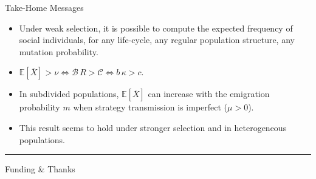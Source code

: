 \documentclass[aspectratio=169]{beamer}
\begin{document}
\begin{frame}{Take-Home Messages}

\begin{itemize}
\item Under weak selection, it is
possible to compute the expected frequency of social
individuals, for any life-cycle, any regular population structure,  any mutation probability. 

\item $\mathbb{E}[\overline{X}]>\nu \Leftrightarrow \mathcal{B}\, R > \mathcal{C} \Leftrightarrow b \, \kappa > c$.

\item In subdivided populations, $\mathbb{E}[\overline{X}]$ can increase with the emigration probability $m$ when strategy transmission is imperfect ($\mu > 0$).

\item This result seems to hold under stronger selection and in heterogeneous populations.
\end{itemize}



\btVFill

\hrule
\begin{block}{Funding \& Thanks}
\begin{center}
\vspace{-0.25cm}

\end{center}

\end{block}
\end{frame}
\end{document}
